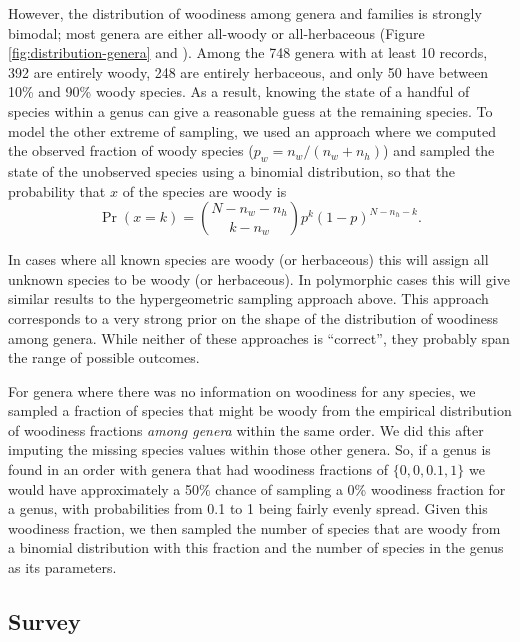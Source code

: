 \documentclass[a4paper,12pt]{article}
\begin{document}
However, the distribution of woodiness among genera and families is
strongly bimodal; most genera are either all-woody or all-herbaceous
(Figure \ref{fig:distribution-genera} and 
\citealt{sinnott1915evolution}).  Among the 748 genera with at least 10
records, 392 are entirely woody, 248 are entirely herbaceous, and only
50 have between 10\% and 90\% woody species. As a result, knowing the
state of a handful of species within a genus can give a reasonable
guess at the remaining species.
To model the other extreme of sampling, we used an approach where we
computed the observed fraction of woody species ($p_w = n_w / (n_w +
n_h)$) and sampled the state of the unobserved species using a
binomial distribution, so that the probability that $x$ of the species
are woody is
\begin{equation}
  \Pr(x = k) = {N - n_w - n_h \choose k - n_w} 
  p^k (1-p)^{N - n_h - k}.
\end{equation}

In cases where all known species are woody (or herbaceous) this will
assign all unknown species to be woody (or herbaceous). In polymorphic
cases this will give similar results to the hypergeometric sampling
approach above. This approach corresponds to a very strong prior on
the shape of the distribution of woodiness among genera.
While neither of these approaches is ``correct'', they probably
span the range of possible outcomes.

For genera where there was no information on woodiness for any
species, we sampled a fraction of species that might be woody from the
empirical distribution of woodiness fractions \textit{among genera}
within the same order. We did this after imputing the missing species
values within those other genera. So, if a genus is found in an order
with genera that had woodiness fractions of $\{0, 0, 0.1, 1\}$ we would
have approximately a 50\% chance of sampling a 0\% woodiness fraction
for a genus, with probabilities from 0.1 to 1 being fairly evenly
spread.  Given this woodiness fraction, we then sampled the number of
species that are woody from a binomial distribution with this fraction
and the number of species in the genus as its parameters.

\subsection{Survey}
\end{document}
